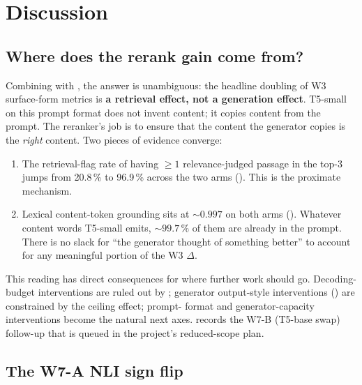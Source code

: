 \documentclass[11pt,a4paper]{article}
\begin{document}
\clearpage\section{Discussion}
\label{sec:discussion}

\subsection{Where does the rerank gain come from?}
\label{sec:discussion-where}

Combining  with , the answer
is unambiguous: the headline doubling of W3 surface-form metrics is
\textbf{a retrieval effect, not a generation effect}.  T5-small on
this prompt format does not invent content; it copies content from
the prompt.  The reranker's job is to ensure that the content the
generator copies is the \emph{right} content.  Two pieces of
evidence converge:

\begin{enumerate}
  \item The retrieval-flag rate of having $\geq\!1$
        relevance-judged passage in the top-3 jumps from 20.8\,\%
        to 96.9\,\% across the two arms ().
        This is the proximate mechanism.
  \item Lexical content-token grounding sits at $\sim\!0.997$ on
        both arms ().  Whatever content
        words T5-small emits, $\sim\!99.7\,\%$ of them are already
        in the prompt.  There is no slack for ``the generator
        thought of something better'' to account for any meaningful
        portion of the W3 $\Delta$.
\end{enumerate}

This reading has direct consequences for where further work should
go.  Decoding-budget interventions are ruled out by
; generator output-style interventions
() are constrained by the ceiling effect; prompt-
format and generator-capacity interventions become the natural next
axes.   records the W7-B (T5-base swap)
follow-up that is queued in the project's reduced-scope plan.

\subsection{The W7-A NLI sign flip}
\label{sec:discussion-nli-flip}
\end{document}
